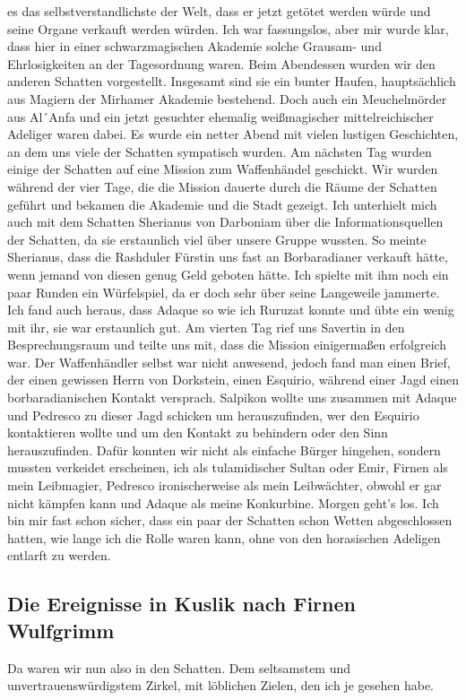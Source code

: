 es das selbstverstandlichste der Welt, dass er jetzt getötet werden würde und seine Organe verkauft werden würden. Ich war fassungslos, aber mir wurde klar, dass hier in einer schwarzmagischen Akademie solche Grausam- und Ehrlosigkeiten an der Tagesordnung waren. Beim Abendessen wurden wir den anderen Schatten vorgestellt. Insgesamt sind sie ein bunter Haufen, hauptsächlich aus Magiern der Mirhamer Akademie bestehend. Doch auch ein Meuchelmörder aus Al´Anfa und ein jetzt gesuchter ehemalig weißmagischer mittelreichischer Adeliger waren dabei. Es wurde ein netter Abend mit vielen lustigen Geschichten, an dem uns viele der Schatten sympatisch wurden. Am nächsten Tag wurden einige der Schatten auf eine Mission zum Waffenhändel geschickt. Wir wurden während der vier Tage, die die Mission dauerte durch die Räume der Schatten geführt und bekamen die Akademie und die Stadt gezeigt. Ich unterhielt mich auch mit dem Schatten Sherianus von Darboniam über die Informationsquellen der Schatten, da sie erstaunlich viel über unsere Gruppe wussten. So meinte Sherianus, dass die Rashduler Fürstin uns fast an Borbaradianer verkauft hätte, wenn jemand von diesen genug Geld geboten hätte. Ich spielte mit ihm noch ein paar Runden ein Würfelspiel, da er doch sehr über seine Langeweile jammerte. Ich fand auch heraus, dass Adaque so wie ich Ruruzat konnte und übte ein wenig mit ihr, sie war erstaunlich gut. Am vierten Tag rief uns Savertin in den Besprechungsraum und teilte uns mit, dass die Mission einigermaßen erfolgreich war. Der Waffenhändler selbst war nicht anwesend, jedoch fand man einen Brief, der einen gewissen Herrn von Dorkstein, einen Esquirio, während einer Jagd einen borbaradianischen Kontakt versprach. Salpikon wollte uns zusammen mit Adaque und Pedresco zu dieser Jagd schicken um herauszufinden, wer den Esquirio kontaktieren wollte und um den Kontakt zu behindern oder den Sinn herauszufinden. Dafür konnten wir nicht als einfache Bürger hingehen, sondern mussten verkeidet erscheinen, ich als tulamidischer Sultan oder Emir, Firnen als mein Leibmagier, Pedresco ironischerweise als mein Leibwächter, obwohl er gar nicht kämpfen kann und Adaque als meine Konkurbine. Morgen geht’s los. Ich bin mir fast schon sicher, dass ein paar der Schatten schon Wetten abgeschlossen hatten, wie lange ich die Rolle waren kann, ohne von den horasischen Adeligen entlarft zu werden.

\subsection{Die Ereignisse in Kuslik nach Firnen Wulfgrimm}
Da waren wir nun also in den Schatten. Dem seltsamstem und unvertrauenswürdigstem Zirkel, mit löblichen Zielen, den ich je gesehen habe.

